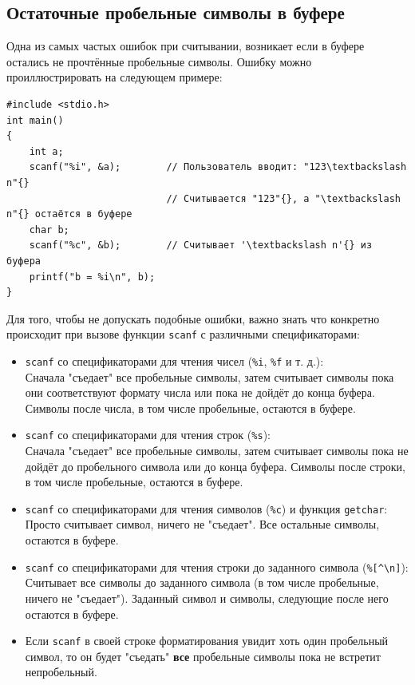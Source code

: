 \documentclass{article}
\begin{document}
\subsection*{Остаточные пробельные символы в буфере}
Одна из самых частых ошибок при считывании, возникает если в буфере остались не прочтённые пробельные символы. Ошибку можно проиллюстрировать на следующем примере:
\begin{lstlisting}
#include <stdio.h>
int main()
{
    int a;
    scanf("%i", &a);		// Пользователь вводит: "123\textbackslash n"{}
    						// Считывается "123"{}, а "\textbackslash n"{} остаётся в буфере 
    char b;
    scanf("%c", &b);		// Считывает '\textbackslash n'{} из буфера
    printf("b = %i\n", b);
}
\end{lstlisting}
Для того, чтобы не допускать подобные ошибки, важно знать что конкретно происходит при вызове функции \texttt{scanf} с различными спецификаторами:
\begin{itemize}
\item \texttt{scanf} со спецификаторами для чтения чисел (\texttt{\%i}, \texttt{\%f} и т. д.):\\
Сначала "съедает"{} все пробельные символы, затем считывает символы пока они соответствуют формату числа или пока не дойдёт до конца буфера. Символы после числа, в том числе пробельные, остаются в буфере.

\item \texttt{scanf} со спецификаторами для чтения строк (\texttt{\%s}):\\
Сначала "съедает"{} все пробельные символы, затем считывает символы пока не дойдёт до пробельного символа или  до конца буфера. Символы после строки, в том числе пробельные, остаются в буфере.

\item \texttt{scanf} со спецификаторами для чтения символов (\texttt{\%c}) и функция \texttt{getchar}:\\
Просто считывает символ, ничего не "съедает"{}. Все остальные символы, остаются в буфере.

\item \texttt{scanf} со спецификаторами для чтения строки до заданного символа (\texttt{\%[\textasciicircum \textbackslash n]}):\\
Считывает все символы до заданного символа (в том числе пробельные, ничего не "съедает"{}). Заданный символ и символы, следующие после него остаются в буфере. 

\item Если \texttt{scanf} в своей строке форматирования увидит хоть один пробельный символ, то он будет "съедать"{} \textbf{все} пробельные символы пока не встретит непробельный.
\end{itemize}
\end{document}

